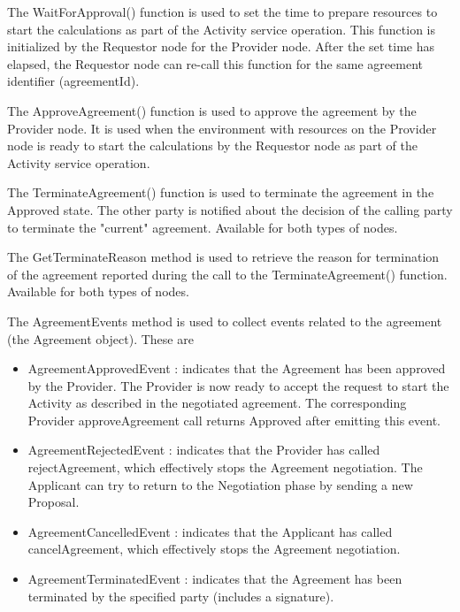 \begin{enumerate}
\begin{enumerate}
The WaitForApproval() function is used to set the time to prepare resources to start the calculations as part of the Activity service operation.
This function is initialized by the Requestor node for the Provider node. After the set time has elapsed, the Requestor node can
re-call this function for the same agreement identifier (agreementId).

The ApproveAgreement() function is used to approve the agreement by the Provider node. It is used when the environment with
resources on the Provider node is ready to start the calculations by the Requestor node as part of the Activity service operation.

The TerminateAgreement() function is used to terminate the agreement in the Approved state.
The other party is notified about the decision of the calling party to terminate the "current" agreement. Available for both types of nodes.

The GetTerminateReason method is used to retrieve the reason for termination of the agreement reported during the call to the TerminateAgreement() function. Available for both types of nodes.

The AgreementEvents method is used to collect events related to the agreement (the Agreement object). These are

\begin{itemize}

\item AgreementApprovedEvent : 	indicates that the Agreement has been approved by the Provider.
								The Provider is now ready to accept the request to start the Activity
								as described in the negotiated agreement.
								The corresponding Provider approveAgreement call returns Approved after emitting this event.

\item AgreementRejectedEvent : 	indicates that the Provider has called rejectAgreement, which effectively stops the Agreement negotiation.
								The Applicant can try to return to the Negotiation phase by sending a new Proposal.

\item AgreementCancelledEvent : indicates that the Applicant has called cancelAgreement, which effectively stops the Agreement negotiation.

\item AgreementTerminatedEvent : indicates that the Agreement has been terminated by the specified party (includes a signature).

\end{itemize}


\end{enumerate}
\end{enumerate}
